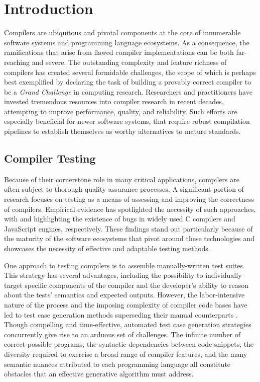 \chapter{\label{cha:intro}Introduction}

Compilers are ubiquitous and pivotal components
at the core of innumerable software systems and programming language ecosystems.
As a consequence, the ramifications that arise from flawed
compiler implementations can be both far-reaching and severe.
The outstanding complexity and feature richness of compilers has created
several formidable challenges, the scope of which is perhaps best exemplified
by \citet{hoare2003verifying}
declaring the task of building a provably correct compiler to be a 
\textit{Grand Challenge} in computing research.
Researchers and practitioners have invested tremendous resources
into compiler research in recent decades, attempting to improve
performance, quality, and reliability. 
Such efforts are especially beneficial for newer software systems,
that require robust compilation pipelines to establish themselves
as worthy alternatives to mature standards.


\section{Compiler Testing}

Because of their cornerstone role in many critical applications,
compilers are often subject to thorough quality assurance processes.
A significant portion of research focuses on testing as a means
of assessing and improving the correctness of compilers.
Empirical evidence has spotlighted the necessity of such approaches,
with \citet{sun2016toward} and \citet{holler2012fuzzing} highlighting
the existence of bugs in widely used C compilers and JavaScript engines, respectively. 
These findings stand out particularly because of the maturity of the
software ecosystems that pivot around these technologies and showcases
the necessity of effective and adaptable testing methods.

One approach to testing compilers is to assemble manually-written test suites.
This strategy has several advantages, including the possibility to individually
target specific components of the compiler and the developer's ability to
reason about the tests' semantics and expected outputs. However, the labor-intensive
nature of the process and the imposing complexity of compiler code bases have
led to test case generation methods superseding their 
manual counterparts \citep{chen2020survey, zhao2009automated}.
Though compelling and time-effective, automated test case
generation strategies concurrently give rise to an arduous set of challenges.
The infinite number of correct possible programs, the syntactic dependencies between code snippets,
the diversity required to exercise a broad range of compiler features,
and the many semantic nuances attributed to each programming language all constitute
obstacles that an effective generative algorithm must address.

